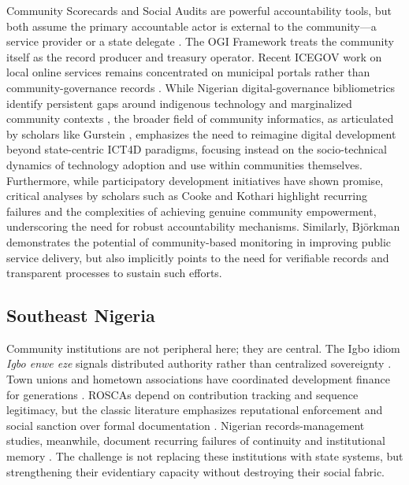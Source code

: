 \documentclass[sigconf,anonymous]{acmart}
\begin{document}
Community Scorecards and Social Audits are powerful accountability tools, but both assume the primary accountable actor is external to the community—a service provider or a state delegate \cite{schouten2011, cooke2001}. The OGI Framework treats the community itself as the record producer and treasury operator. Recent ICEGOV work on local online services remains concentrated on municipal portals rather than community-governance records \cite{gasco2017, janowski2015}. While Nigerian digital-governance bibliometrics identify persistent gaps around indigenous technology and marginalized community contexts \cite{ifinedo2006}, the broader field of community informatics, as articulated by scholars like Gurstein \cite{gurstein2007}, emphasizes the need to reimagine digital development beyond state-centric ICT4D paradigms, focusing instead on the socio-technical dynamics of technology adoption and use within communities themselves. Furthermore, while participatory development initiatives have shown promise, critical analyses by scholars such as Cooke and Kothari \cite{cooke2001} highlight recurring failures and the complexities of achieving genuine community empowerment, underscoring the need for robust accountability mechanisms. Similarly, Björkman \cite{bjorkman2009} demonstrates the potential of community-based monitoring in improving public service delivery, but also implicitly points to the need for verifiable records and transparent processes to sustain such efforts.

\subsection{Southeast Nigeria}

Community institutions are not peripheral here; they are central. The Igbo idiom \textit{Igbo enwe eze} signals distributed authority rather than centralized sovereignty \cite{okafor1992}. Town unions and hometown associations have coordinated development finance for generations \cite{honey1998, uduku2002}. ROSCAs depend on contribution tracking and sequence legitimacy, but the classic literature emphasizes reputational enforcement and social sanction over formal documentation \cite{ardener1964, besley1993}. Nigerian records-management studies, meanwhile, document recurring failures of continuity and institutional memory \cite{abioye2007}. The challenge is not replacing these institutions with state systems, but strengthening their evidentiary capacity without destroying their social fabric.
\end{document}
